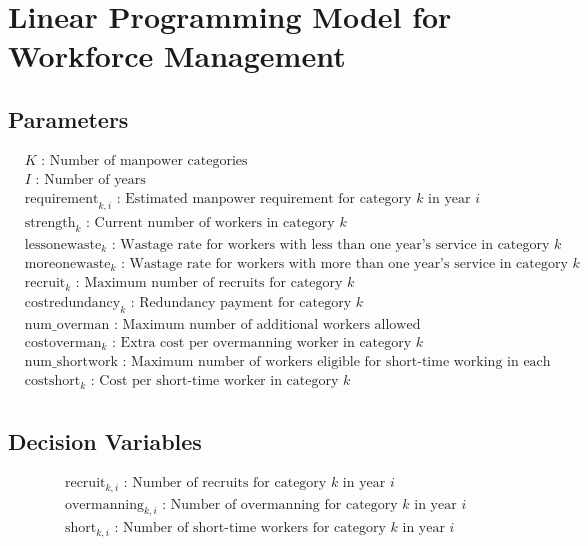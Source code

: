 \documentclass{article}
\begin{document}
\section*{Linear Programming Model for Workforce Management}

\subsection*{Parameters}
\begin{align*}
& K \text{ : Number of manpower categories} \\
& I \text{ : Number of years} \\
& \text{requirement}_{k,i} \text{ : Estimated manpower requirement for category } k \text{ in year } i \\
& \text{strength}_{k} \text{ : Current number of workers in category } k \\
& \text{lessonewaste}_{k} \text{ : Wastage rate for workers with less than one year's service in category } k \\
& \text{moreonewaste}_{k} \text{ : Wastage rate for workers with more than one year's service in category } k \\
& \text{recruit}_{k} \text{ : Maximum number of recruits for category } k \\
& \text{costredundancy}_{k} \text{ : Redundancy payment for category } k \\
& \text{num\_overman} \text{ : Maximum number of additional workers allowed} \\
& \text{costoverman}_{k} \text{ : Extra cost per overmanning worker in category } k \\
& \text{num\_shortwork} \text{ : Maximum number of workers eligible for short-time working in each category} \\
& \text{costshort}_{k} \text{ : Cost per short-time worker in category } k \\
\end{align*}

\subsection*{Decision Variables}
\begin{align*}
& \text{recruit}_{k,i} \text{ : Number of recruits for category } k \text{ in year } i \\
& \text{overmanning}_{k,i} \text{ : Number of overmanning for category } k \text{ in year } i \\
& \text{short}_{k,i} \text{ : Number of short-time workers for category } k \text{ in year } i \\
\end{align*}
\end{document}
